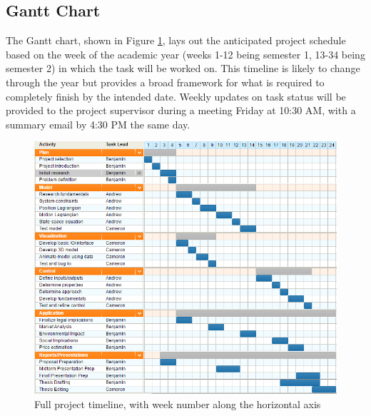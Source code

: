 \subsection{Gantt Chart}
The Gantt chart, shown in Figure \ref{fig:gantt}, lays out the anticipated project schedule based on the week of the academic year (weeks 1-12 being semester 1, 13-34 being semester 2) in which the task will be worked on. This timeline is likely to change through the year but provides a broad framework for what is required to completely finish by the intended date. Weekly updates on task status will be provided to the project supervisor during a meeting Friday at 10:30 AM, with a summary email by 4:30 PM the same day.
\begin{figure}[!htb]
\centering
{}
\includegraphics[width=\linewidth]{Gantt_Chart.PNG}
\caption{Full project timeline, with week number along the horizontal axis }\label{fig:gantt}
\endminipage
\end{figure}

\clearpage
